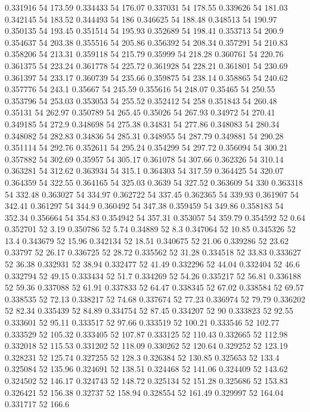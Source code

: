 0.331916 54 173.59
0.334433 54 176.07
0.337031 54 178.55
0.339626 54 181.03
0.342145 54 183.52
0.344493 54 186
0.346625 54 188.48
0.348513 54 190.97
0.350135 54 193.45
0.351514 54 195.93
0.352689 54 198.41
0.353713 54 200.9
0.354637 54 203.38
0.355516 54 205.86
0.356392 54 208.34
0.357291 54 210.83
0.358206 54 213.31
0.359118 54 215.79
0.35999 54 218.28
0.360761 54 220.76
0.361375 54 223.24
0.361778 54 225.72
0.361928 54 228.21
0.361801 54 230.69
0.361397 54 233.17
0.360739 54 235.66
0.359875 54 238.14
0.358865 54 240.62
0.357776 54 243.1
0.35667 54 245.59
0.355616 54 248.07
0.35465 54 250.55
0.353796 54 253.03
0.353053 54 255.52
0.352412 54 258
0.351843 54 260.48
0.35131 54 262.97
0.350789 54 265.45
0.35026 54 267.93
0.34972 54 270.41
0.349185 54 272.9
0.348698 54 275.38
0.34831 54 277.86
0.348083 54 280.34
0.348082 54 282.83
0.34836 54 285.31
0.348955 54 287.79
0.349881 54 290.28
0.351114 54 292.76
0.352611 54 295.24
0.354299 54 297.72
0.356094 54 300.21
0.357882 54 302.69
0.35957 54 305.17
0.361078 54 307.66
0.362326 54 310.14
0.363281 54 312.62
0.363934 54 315.1
0.364303 54 317.59
0.364425 54 320.07
0.364359 54 322.55
0.364165 54 325.03
0.3639 54 327.52
0.363609 54 330
0.363318 54 332.48
0.363027 54 334.97
0.362722 54 337.45
0.362365 54 339.93
0.361907 54 342.41
0.361297 54 344.9
0.360492 54 347.38
0.359459 54 349.86
0.358183 54 352.34
0.356664 54 354.83
0.354942 54 357.31
0.353057 54 359.79
0.354592 52 0.64
0.352701 52 3.19
0.350786 52 5.74
0.34889 52 8.3
0.347064 52 10.85
0.345326 52 13.4
0.343679 52 15.96
0.342134 52 18.51
0.340675 52 21.06
0.339286 52 23.62
0.33797 52 26.17
0.336725 52 28.72
0.335562 52 31.28
0.334518 52 33.83
0.333627 52 36.38
0.332931 52 38.94
0.332477 52 41.49
0.332296 52 44.04
0.332404 52 46.6
0.332794 52 49.15
0.333434 52 51.7
0.334269 52 54.26
0.335217 52 56.81
0.336188 52 59.36
0.337088 52 61.91
0.337833 52 64.47
0.338345 52 67.02
0.338584 52 69.57
0.338535 52 72.13
0.338217 52 74.68
0.337674 52 77.23
0.336974 52 79.79
0.336202 52 82.34
0.335439 52 84.89
0.334754 52 87.45
0.334207 52 90
0.333823 52 92.55
0.333601 52 95.11
0.333517 52 97.66
0.333519 52 100.21
0.333546 52 102.77
0.333529 52 105.32
0.333405 52 107.87
0.333125 52 110.43
0.332665 52 112.98
0.332018 52 115.53
0.331202 52 118.09
0.330262 52 120.64
0.329252 52 123.19
0.328231 52 125.74
0.327255 52 128.3
0.326384 52 130.85
0.325653 52 133.4
0.325084 52 135.96
0.324691 52 138.51
0.324468 52 141.06
0.324409 52 143.62
0.324502 52 146.17
0.324743 52 148.72
0.325134 52 151.28
0.325686 52 153.83
0.326421 52 156.38
0.32737 52 158.94
0.328554 52 161.49
0.329997 52 164.04
0.331717 52 166.6
